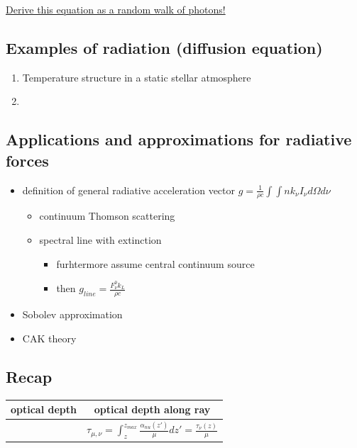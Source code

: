 \documentclass[../main/main.tex]{subfiles}
\begin{document}
\underline{Derive this equation as a random walk of photons!}

\subsection{Examples of radiation (diffusion equation)}
\begin{enumerate}
\item Temperature structure in a static stellar atmosphere
\item 
\end{enumerate}

\subsection{Applications and approximations for radiative forces}
\begin{itemize}
\item definition of general radiative acceleration vector $g = \frac{1}{\rho c}\int \int n k_{\nu} I_{\nu} d\Omega d\nu$
\begin{itemize}
\item continuum Thomson scattering
\item spectral line with extinction
\begin{itemize}
\item furhtermore assume central continuum source
\item then $g_{line} = \frac{F_{\nu}^0 k_L}{\rho c}$
\end{itemize}
\end{itemize}

\item Sobolev approximation
\item CAK theory
\end{itemize}

\subsection{Recap}
\begin{center}
\centering
{\tabulinesep=1.5mm
\begin{tabu}{|c|c|}
\hline 
optical depth & optical depth along ray \\ \hline
& $\tau_{\mu,\nu} = \int_z^{z_{max}} \frac{\alpha_{nu}(z')}{\mu}dz' = \frac{\tau_{\nu}(z)}{\mu}$ \\ \hline
\end{tabu}}
\end{center}


\newpage
\end{document}
